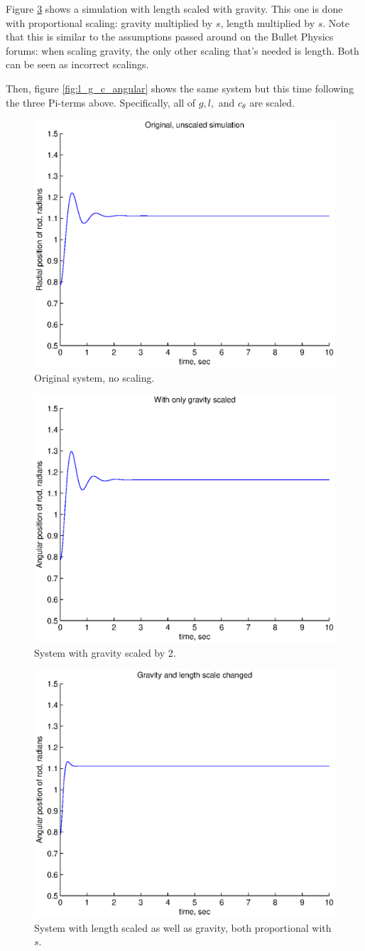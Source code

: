 \documentclass[12pt,letterpaper]{article}
\begin{document}
Figure \ref{fig:l_g_angular} shows a simulation with length scaled with gravity.
This one is done with proportional scaling: gravity multiplied by $s$, length multiplied by $s$.
Note that this is similar to the assumptions passed around on the Bullet Physics forums: when scaling gravity, the only other scaling that's needed is length.
Both can be seen as incorrect scalings.

Then, figure \ref{fig:l_g_c_angular} shows the same system but this time following the three Pi-terms above.
Specifically, all of $g, l,$ and $c_{\theta}$ are scaled.

\begin{figure}[ht]
  \centering
  \includegraphics[width=.48\linewidth]{img/original_angular.eps}
  \caption{Original system, no scaling. }
  \label{fig:original_angular}
\end{figure}

\begin{figure}[ht]
  \centering
  \includegraphics[width=.48\linewidth]{img/grav_only_angular.eps}
  \caption{System with gravity scaled by 2. }
  \label{fig:grav_only_angular}
\end{figure}

\begin{figure}[ht]
  \centering
  \includegraphics[width=.48\linewidth]{img/l_g_angular.eps}
  \caption{System with length scaled as well as gravity, both proportional with $s$. }
  \label{fig:l_g_angular}
\end{figure}
\end{document}
